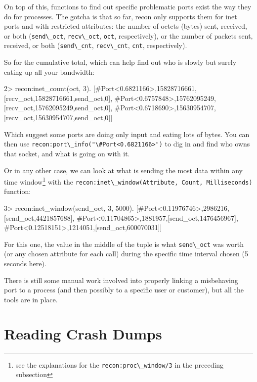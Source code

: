 \documentclass[11pt, oneside]{book}   	%
\newcommand{\function}[1]{\Verb`#1`}
\newcommand{\expression}[1]{\Verb`#1`}
\begin{document}
On top of this, functions to find out specific problematic ports exist the way they do for processes. The gotcha is that so far, recon only supports them for inet ports and with restricted attributes: the number of octets (bytes) sent, received, or both (\expression{send\_oct}, \expression{recv\_oct}, \expression{oct}, respectively), or the number of packets sent, received, or both (\expression{send\_cnt}, \expression{recv\_cnt}, \expression{cnt}, respectively).

So for the cumulative total, which can help find out who is slowly but surely eating up all your bandwidth:

\begin{VerbatimEshell}
2> recon:inet_count(oct, 3).
[{#Port<0.6821166>,15828716661,
  [{recv_oct,15828716661},{send_oct,0}]},
 {#Port<0.6757848>,15762095249,
  [{recv_oct,15762095249},{send_oct,0}]},
 {#Port<0.6718690>,15630954707,
  [{recv_oct,15630954707},{send_oct,0}]}]
\end{VerbatimEshell}

Which suggest some ports are doing only input and eating lots of bytes. You can then use \function{recon:port\_info("\#Port<0.6821166>")} to dig in and find who owns that socket, and what is going on with it.

Or in any other case, we can look at what is sending the most data within any time window\footnote{see the explanations for the \function{recon:proc\_window/3} in the preceding subsection} with the \function{recon:inet\_window(Attribute, Count, Milliseconds)} function:

\begin{VerbatimEshell}
3> recon:inet_window(send_oct, 3, 5000).
[{#Port<0.11976746>,2986216,[{send_oct,4421857688}]},
 {#Port<0.11704865>,1881957,[{send_oct,1476456967}]},
 {#Port<0.12518151>,1214051,[{send_oct,600070031}]}]
\end{VerbatimEshell}

For this one, the value in the middle of the tuple is what \expression{send\_oct} was worth (or any chosen attribute for each call) during the specific time interval chosen (5 seconds here).

There is still some manual work involved into properly linking a misbehaving port to a process (and then possibly to a specific user or customer), but all the tools are in place. 


\chapter{Reading Crash Dumps}
\label{chap:crash-dumps}
\end{document}
